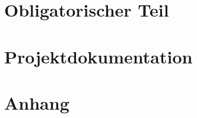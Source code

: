 \documentclass[10pt, oneside, numbers=noenddot, chapterprefix=true, chapterformat=kapitel]{scrbook}
\begin{document}

\frontmatter
{}


\tableofcontents
\mainmatter
\pagestyle{fancy}

\part{Obligatorischer Teil}


\part{Projektdokumentation}


\part{Anhang}

\end{document}
